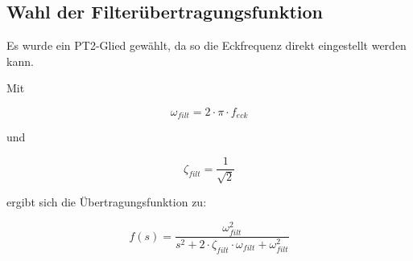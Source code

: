 \subsection{Wahl der Filterübertragungsfunktion}

Es wurde ein PT2-Glied gewählt, da so die Eckfrequenz direkt eingestellt werden 
kann. %

Mit

\begin{equation}
	\omega_{filt} = 2 \cdot \pi \cdot f_{eck}
\end{equation}

und

\begin{equation}
	\zeta_{filt} = \frac{1}{\sqrt{2}}
\end{equation}

ergibt sich die Übertragungsfunktion zu:

\begin{equation}
	f(s) = \frac{\omega_{filt}^2}{s^2+2 \cdot \zeta_{filt} \cdot \omega_{filt} +\omega_{filt}^2}
\end{equation}